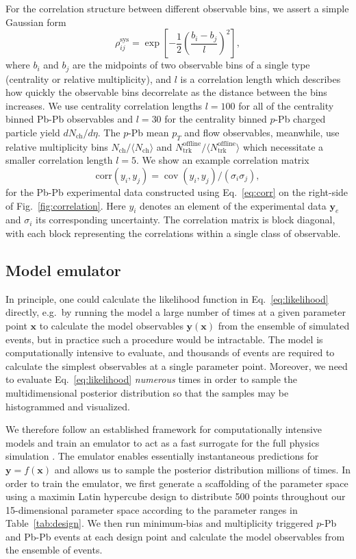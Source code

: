 \documentclass[aps,prc,reprint,amsmath,nofootinbib]{revtex4-1}
\newcommand{\nch}{N_\text{ch}}
\newcommand{\ntrk}{N_\text{trk}^\text{offline}}
\newcommand{\xv}{\mathbf x}
\newcommand{\yv}{\mathbf y}
\DeclareMathOperator{\cov}{cov}
\begin{document}
For the correlation structure between different observable bins, we assert a simple Gaussian form
\begin{equation}
  \label{eq:corr}
  \rho_{ij}^\text{sys} = \exp \left[ -\frac{1}{2} \left(\frac{b_i - b_j}{l} \right)^2 \right],
\end{equation}
where $b_i$ and $b_j$ are the midpoints of two observable bins of a single type (centrality or relative multiplicity), and $l$ is a correlation length which describes how quickly the observable bins decorrelate as the distance between the bins increases.
We use centrality correlation lengths $l=100$ for all of the centrality binned Pb-Pb observables and $l=30$ for the centrality binned $p$-Pb charged particle yield $d\nch/d\eta$.
The \mbox{$p$-Pb} mean $p_T$ and flow observables, meanwhile, use relative multiplicity bins $\nch / \langle \nch \rangle$ and $\ntrk / \langle \ntrk \rangle$ which necessitate a smaller correlation length $l=5$.
We show an example correlation matrix
\begin{equation}
  \mathrm{corr}(y_i, y_j) = \cov(y_i, y_j)/(\sigma_i \sigma_j),
\end{equation}
for the Pb-Pb experimental data constructed using Eq.~\eqref{eq:corr} on the right-side of Fig.~\ref{fig:correlation}.
Here $y_i$ denotes an element of the experimental data $\yv_e$ and $\sigma_i$ its corresponding uncertainty.
The correlation matrix is block diagonal, with each block representing the correlations within a single class of observable.

\subsection{Model emulator}

In principle, one could calculate the likelihood function in Eq.~\eqref{eq:likelihood} directly, e.g.\ by running the model a large number of times at a given parameter point $\xv$ to calculate the model observables $\yv(\xv)$ from the ensemble of simulated events, but in practice such a procedure would be intractable.
The model is computationally intensive to evaluate, and thousands of events are required to calculate the simplest observables at a single parameter point.
Moreover, we need to evaluate Eq.~\eqref{eq:likelihood} \emph{numerous} times in order to sample the multidimensional posterior distribution so that the samples may be histogrammed and visualized.

We therefore follow an established framework for computationally intensive models and train an emulator to act as a fast surrogate for the full physics simulation \cite{OHagan:2006ba, Higdon:2008cmc, Higdon:2014tva}.
The emulator enables essentially instantaneous predictions for $\yv = f(\xv)$ and allows us to sample the posterior distribution millions of times.
In order to train the emulator, we first generate a scaffolding of the parameter space using a maximin Latin hypercube design \cite{Morris:1995lh} to distribute 500 points throughout our 15-dimensional parameter space according to the parameter ranges in Table~\ref{tab:design}.
We then run minimum-bias and multiplicity triggered $p$-Pb and Pb-Pb events at each design point and calculate the model observables from the ensemble of events.
\end{document}
